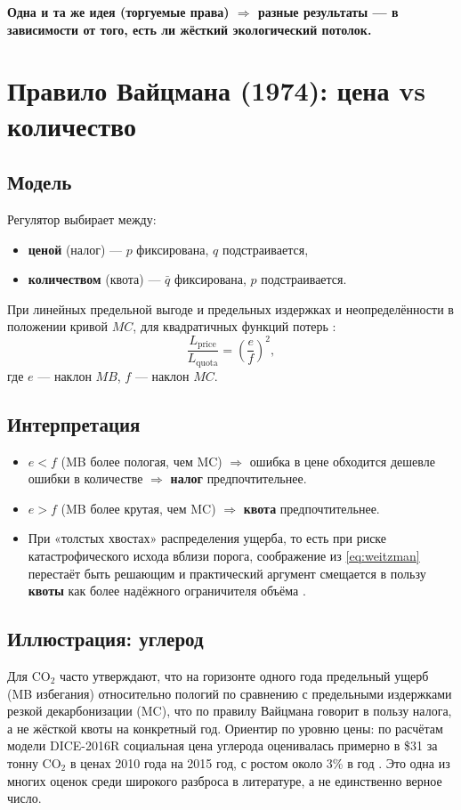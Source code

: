 \documentclass[11pt]{article}
\begin{document}
\textbf{Одна и та же идея (торгуемые права) $\Rightarrow$ разные результаты — в зависимости от того, есть ли жёсткий экологический потолок.}

\section{Правило Вайцмана (1974): цена vs количество}

\subsection{Модель}
Регулятор выбирает между:
\begin{itemize}
\item \textbf{ценой} (налог) — $p$ фиксирована, $q$ подстраивается,
\item \textbf{количеством} (квота) — $\bar{q}$ фиксирована, $p$ подстраивается.
\end{itemize}

При линейных предельной выгоде и предельных издержках и неопределённости в положении кривой $MC$, для квадратичных функций потерь \cite{weitzman1974prices}:
\begin{equation}\label{eq:weitzman}
\frac{L_{\text{price}}}{L_{\text{quota}}} = \left( \frac{e}{f} \right)^2,
\end{equation}
где $e$ — наклон $MB$, $f$ — наклон $MC$.

\subsection{Интерпретация}
\begin{itemize}
\item $e < f$ (MB более пологая, чем MC) $\Rightarrow$ ошибка в цене обходится дешевле ошибки в количестве $\Rightarrow$ \textbf{налог} предпочтительнее.
\item $e > f$ (MB более крутая, чем MC) $\Rightarrow$ \textbf{квота} предпочтительнее.
\item При «толстых хвостах» распределения ущерба, то есть при риске катастрофического исхода вблизи порога, соображение из \eqref{eq:weitzman} перестаёт быть решающим и практический аргумент смещается в пользу \textbf{квоты} как более надёжного ограничителя объёма \cite{weitzman2009tails}.
\end{itemize}

\subsection{Иллюстрация: углерод}
Для CO$_2$ часто утверждают, что на горизонте одного года предельный ущерб (MB избегания) относительно пологий по сравнению с предельными издержками резкой декарбонизации (MC), что по правилу Вайцмана говорит в пользу налога, а не жёсткой квоты на конкретный год. Ориентир по уровню цены: по расчётам модели DICE-2016R социальная цена углерода оценивалась примерно в \$31 за тонну CO$_2$ в ценах 2010 года на 2015 год, с ростом около 3\% в год \cite{nordhaus2017scc}. Это одна из многих оценок среди широкого разброса в литературе, а не единственно верное число.
\end{document}
